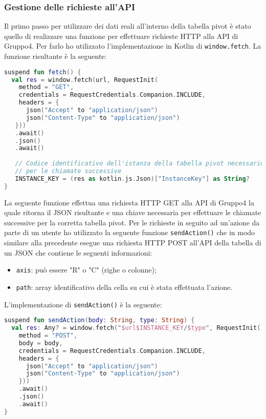 \subsubsection{Gestione delle richieste all'API}
Il primo passo per utilizzare dei dati reali all'interno della tabella pivot è stato quello di realizzare una funzione per effettuare richieste HTTP alla API di Gruppo4. Per farlo ho utilizzato l'implementazione in Kotlin di \verb|window.fetch|. La funzione risultante è la seguente:
\begin{lstlisting}[caption={Funzione fetch()}, label={lst:bodycells}, language=Kotlin]
suspend fun fetch() {
  val res = window.fetch(url, RequestInit(
    method = "GET",
    credentials = RequestCredentials.Companion.INCLUDE,
    headers = {
      json("Accept" to "application/json")
      json("Content-Type" to "application/json")
   }))
   .await()
   .json()
   .await()
   
   // Codice identificativo dell'istanza della tabella pivot necessario
   // per le chiamate successive
   INSTANCE_KEY = (res as kotlin.js.Json)["InstanceKey"] as String?
}
\end{lstlisting}
La seguente funzione effettua una richiesta HTTP GET alla API di Gruppo4 la quale ritorna il JSON risultante e una chiave necessaria per effettuare le chiamate successive per la corretta tabella pivot. Per le richieste in seguito ad un'azione da parte di un utente ho utilizzato la seguente funzione \verb|sendAction()| che in modo similare alla precedente esegue una richiesta HTTP POST all'API della tabella di un JSON che contiene le seguenti informazioni:
\begin{itemize}
	\item \verb|axis|: può essere "R" o "C" (righe o colonne);
	\item \verb|path|: array identificativo della cella su cui è stata effettuata l'azione.
\end{itemize}
L'implementazione di \verb|sendAction()| è la seguente: 
\begin{lstlisting}[caption={Funzione sendAction()}, label={lst:bodycells}, language=Kotlin]
suspend fun sendAction(body: String, type: String) {
  val res: Any? = window.fetch("$url$INSTANCE_KEY/$type", RequestInit(
    method = "POST",
    body = body,
    credentials = RequestCredentials.Companion.INCLUDE,
    headers = {
      json("Accept" to "application/json")
      json("Content-Type" to "application/json")
    }))
    .await()
    .json()
    .await()
}
\end{lstlisting}

